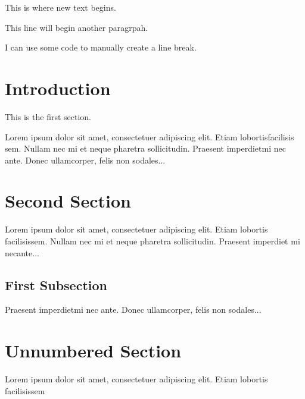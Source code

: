 \documentclass[14pt, a4paper]{article}
\begin{document}
This is where new text begins.

This line will begin another paragrpah.

I can use some code
\newline
to manually create a line break.


\pagebreak

 
\section{Introduction}
 
This is the first section.
 
Lorem  ipsum  dolor  sit  amet,  consectetuer  adipiscing  
elit.   Etiam  lobortisfacilisis sem.  Nullam nec mi et 
neque pharetra sollicitudin.  Praesent imperdietmi nec ante. 
Donec ullamcorper, felis non sodales...
 
\section{Second Section}
 
Lorem ipsum dolor sit amet, consectetuer adipiscing elit.  
Etiam lobortis facilisissem.  Nullam nec mi et neque pharetra 
sollicitudin.  Praesent imperdiet mi necante...
 
\subsection{First Subsection}
Praesent imperdietmi nec ante. Donec ullamcorper, felis non sodales...
 
\section*{Unnumbered Section}
Lorem ipsum dolor sit amet, consectetuer adipiscing elit.  
Etiam lobortis facilisissem
\end{document}
